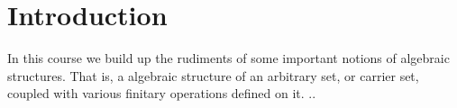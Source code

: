 
\section{Introduction} %
\label{sec:introduction}
In this course we build up the rudiments of some important notions of algebraic structures.
That is, a algebraic structure of an arbitrary set, or carrier set, coupled with various finitary operations defined on it.
..
